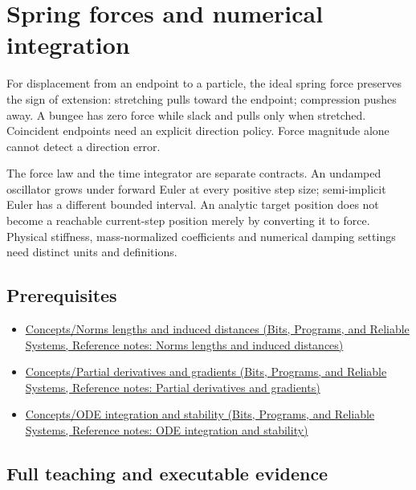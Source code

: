 \hypertarget{appendix-e040e2108923}{}\label{referencestart:appendix-e040e2108923}
\section{Spring forces and numerical integration}\label{appendix-e040e2108923-spring-forces-and-numerical-integration}

For displacement from an endpoint to a particle, the ideal spring force preserves the sign of extension: stretching pulls toward the endpoint; compression pushes away. A bungee has zero force while slack and pulls only when stretched. Coincident endpoints need an explicit direction policy. Force magnitude alone cannot detect a direction error.

The force law and the time integrator are separate contracts. An undamped oscillator grows under forward Euler at every positive step size; semi-implicit Euler has a different bounded interval. An analytic target position does not become a reachable current-step position merely by converting it to force. Physical stiffness, mass-normalized coefficients and numerical damping settings need distinct units and definitions.

\subsection{Prerequisites}\label{appendix-e040e2108923-prerequisites}

\begin{itemize}
\tightlist
\item
  \href{../01-Bits-Programs-and-Reliable-Systems/main.pdf\#nameddest=appendix-49933872bb51}{Concepts/Norms lengths and induced distances (Bits, Programs, and Reliable Systems, Reference notes: Norms lengths and induced distances)}
\item
  \href{../01-Bits-Programs-and-Reliable-Systems/main.pdf\#nameddest=appendix-677b59746ae0}{Concepts/Partial derivatives and gradients (Bits, Programs, and Reliable Systems, Reference notes: Partial derivatives and gradients)}
\item
  \href{../01-Bits-Programs-and-Reliable-Systems/main.pdf\#nameddest=appendix-18eacf61a04b}{Concepts/ODE integration and stability (Bits, Programs, and Reliable Systems, Reference notes: ODE integration and stability)}
\end{itemize}

\subsection{Full teaching and executable evidence}\label{appendix-e040e2108923-full-teaching-and-executable-evidence}

